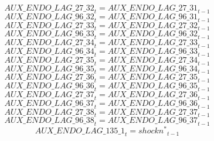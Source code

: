 \begin{dmath}
{AUX\_ENDO\_LAG\_27\_32}_{t}={AUX\_ENDO\_LAG\_27\_31}_{t-1}
\end{dmath}
\begin{dmath}
{AUX\_ENDO\_LAG\_96\_32}_{t}={AUX\_ENDO\_LAG\_96\_31}_{t-1}
\end{dmath}
\begin{dmath}
{AUX\_ENDO\_LAG\_27\_33}_{t}={AUX\_ENDO\_LAG\_27\_32}_{t-1}
\end{dmath}
\begin{dmath}
{AUX\_ENDO\_LAG\_96\_33}_{t}={AUX\_ENDO\_LAG\_96\_32}_{t-1}
\end{dmath}
\begin{dmath}
{AUX\_ENDO\_LAG\_27\_34}_{t}={AUX\_ENDO\_LAG\_27\_33}_{t-1}
\end{dmath}
\begin{dmath}
{AUX\_ENDO\_LAG\_96\_34}_{t}={AUX\_ENDO\_LAG\_96\_33}_{t-1}
\end{dmath}
\begin{dmath}
{AUX\_ENDO\_LAG\_27\_35}_{t}={AUX\_ENDO\_LAG\_27\_34}_{t-1}
\end{dmath}
\begin{dmath}
{AUX\_ENDO\_LAG\_96\_35}_{t}={AUX\_ENDO\_LAG\_96\_34}_{t-1}
\end{dmath}
\begin{dmath}
{AUX\_ENDO\_LAG\_27\_36}_{t}={AUX\_ENDO\_LAG\_27\_35}_{t-1}
\end{dmath}
\begin{dmath}
{AUX\_ENDO\_LAG\_96\_36}_{t}={AUX\_ENDO\_LAG\_96\_35}_{t-1}
\end{dmath}
\begin{dmath}
{AUX\_ENDO\_LAG\_27\_37}_{t}={AUX\_ENDO\_LAG\_27\_36}_{t-1}
\end{dmath}
\begin{dmath}
{AUX\_ENDO\_LAG\_96\_37}_{t}={AUX\_ENDO\_LAG\_96\_36}_{t-1}
\end{dmath}
\begin{dmath}
{AUX\_ENDO\_LAG\_27\_38}_{t}={AUX\_ENDO\_LAG\_27\_37}_{t-1}
\end{dmath}
\begin{dmath}
{AUX\_ENDO\_LAG\_96\_38}_{t}={AUX\_ENDO\_LAG\_96\_37}_{t-1}
\end{dmath}
\begin{dmath}
{AUX\_ENDO\_LAG\_135\_1}_{t}={{shockn^*}}_{t-1}
\end{dmath}
